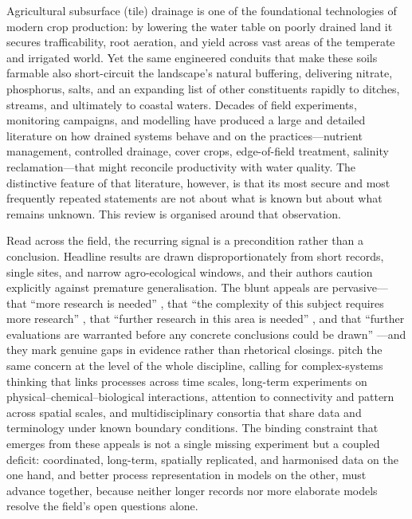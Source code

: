 Agricultural subsurface (tile) drainage is one of the foundational
technologies of modern crop production: by lowering the water table on
poorly drained land it secures trafficability, root aeration, and yield
across vast areas of the temperate and irrigated world. Yet the same
engineered conduits that make these soils farmable also short-circuit the
landscape's natural buffering, delivering nitrate, phosphorus, salts, and
an expanding list of other constituents rapidly to ditches, streams, and
ultimately to coastal waters. Decades of field experiments, monitoring
campaigns, and modelling have produced a large and detailed literature on
how drained systems behave and on the practices---nutrient management,
controlled drainage, cover crops, edge-of-field treatment, salinity
reclamation---that might reconcile productivity with water quality. The
distinctive feature of that literature, however, is that its most secure
and most frequently repeated statements are not about what is known but
about what remains unknown. This review is organised around that
observation.

Read across the field, the recurring signal is a precondition rather than
a conclusion. Headline results are drawn disproportionately from short
records, single sites, and narrow agro-ecological windows, and their
authors caution explicitly against premature generalisation. The blunt
appeals are pervasive---that ``more research is needed''
\parencite{SHALIT1995}, that ``the complexity of this subject requires
more research'' \parencite{Malone2014}, that ``further research in this
area is needed'' \parencite{Woo2023}, and that ``further evaluations are
warranted before any concrete conclusions could be drawn''
\parencite{GUPTA1993}---and they mark genuine gaps in evidence rather than
rhetorical closings. \textcite{Rogger2017} pitch the same concern at the
level of the whole discipline, calling for complex-systems thinking that
links processes across time scales, long-term experiments on
physical--chemical--biological interactions, attention to connectivity and
pattern across spatial scales, and multidisciplinary consortia that share
data and terminology under known boundary conditions. The binding
constraint that emerges from these appeals is not a single missing
experiment but a coupled deficit: coordinated, long-term, spatially
replicated, and harmonised data on the one hand, and better process
representation in models on the other, must advance together, because
neither longer records nor more elaborate models resolve the field's open
questions alone.

